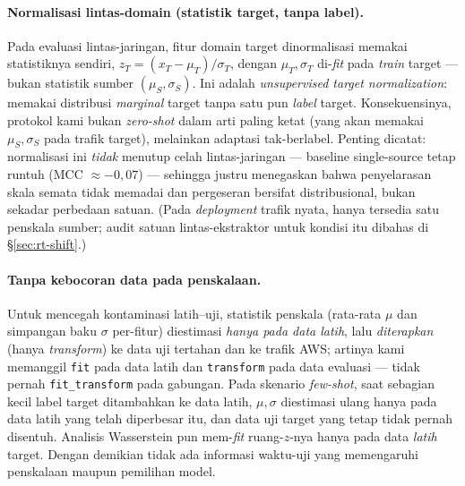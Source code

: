 \documentclass[11pt,a4paper]{article}
\begin{document}
\paragraph{Normalisasi lintas-domain (statistik target, tanpa label).} Pada evaluasi
lintas-jaringan, fitur domain target dinormalisasi memakai statistiknya sendiri,
$z_T = (x_T - \mu_T)/\sigma_T$, dengan $\mu_T,\sigma_T$ di-\emph{fit} pada \emph{train}
target --- bukan statistik sumber $(\mu_S,\sigma_S)$. Ini adalah \emph{unsupervised
target normalization}: memakai distribusi \emph{marginal} target tanpa satu pun
\emph{label} target. Konsekuensinya, protokol kami bukan \emph{zero-shot} dalam arti
paling ketat (yang akan memakai $\mu_S,\sigma_S$ pada trafik target), melainkan
adaptasi tak-berlabel. Penting dicatat: normalisasi ini \emph{tidak} menutup celah
lintas-jaringan --- baseline single-source tetap runtuh (MCC $\approx -0{,}07$) ---
sehingga justru menegaskan bahwa penyelarasan skala semata tidak memadai dan
pergeseran bersifat distribusional, bukan sekadar perbedaan satuan. (Pada
\emph{deployment} trafik nyata, hanya tersedia satu penskala sumber; audit satuan
lintas-ekstraktor untuk kondisi itu dibahas di \S\ref{sec:rt-shift}.)

\paragraph{Tanpa kebocoran data pada penskalaan.} Untuk mencegah kontaminasi
latih--uji, statistik penskala (rata-rata $\mu$ dan simpangan baku $\sigma$
per-fitur) diestimasi \emph{hanya pada data latih}, lalu \emph{diterapkan}
(hanya \emph{transform}) ke data uji tertahan dan ke trafik AWS; artinya kami
memanggil \texttt{fit} pada data latih dan \texttt{transform} pada data evaluasi
--- tidak pernah \texttt{fit\_transform} pada gabungan. Pada skenario \emph{few-shot},
saat sebagian kecil label target ditambahkan ke data latih, $\mu,\sigma$
diestimasi ulang hanya pada data latih yang telah diperbesar itu, dan data uji
target yang tetap tidak pernah disentuh. Analisis Wasserstein pun mem-\emph{fit}
ruang-$z$-nya hanya pada data \emph{latih} target. Dengan demikian tidak ada
informasi waktu-uji yang memengaruhi penskalaan maupun pemilihan model.
\end{document}
